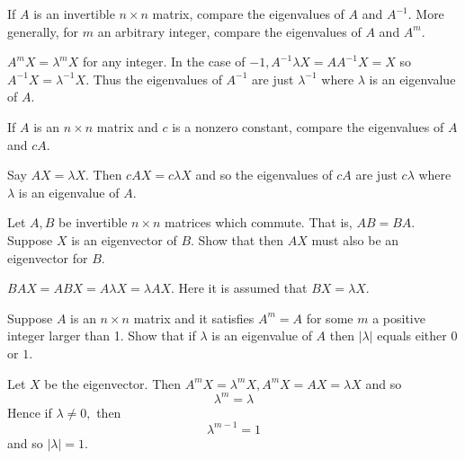 \begin{enumialphparenastyle}

\begin{ex} If $A$ is an invertible $n\times n$ matrix, compare the eigenvalues of
$A$ and $A^{-1}$. More generally, for $m$ an arbitrary integer, compare the
eigenvalues of $A$ and $A^{m}$. \vspace{1mm}
\begin{sol}
$A^{m}X=\lambda ^{m}X$ for
any integer. In the case of $-1,A^{-1}\lambda X=AA^{-1}X=X$
so $A^{-1}X =\lambda ^{-1}X$. Thus the eigenvalues of $A^{-1}$ are just $\lambda ^{-1}$ where $\lambda $ is an eigenvalue of $A$.
\end{sol}
\end{ex} 

\begin{ex} If $A$ is an $n\times n$ matrix and $c$ is a nonzero constant, compare
the eigenvalues of $A$ and $cA$. \vspace{1mm} 
\begin{sol}
Say $AX=\lambda X.$ Then $
cAX=c\lambda X$ and so the eigenvalues of $cA$ are just $
c\lambda $ where $\lambda $ is an eigenvalue of $A$.
\end{sol}
\end{ex}

\begin{ex} Let $A,B$ be invertible $n\times n$ matrices which commute. That is, $AB=BA$. Suppose $X$ is an eigenvector of $B$. Show that then 
$AX$ must also be an eigenvector for $B$. \vspace{1mm} 
\begin{sol}
 $BAX=ABX
=A\lambda X=\lambda AX$. Here it is assumed that $BX=\lambda X$.
\end{sol}
\end{ex}

\begin{ex} Suppose $A$ is an $n\times n$ matrix and it satisfies $A^{m}=A$ for
some $m$ a positive integer larger than 1. Show that if $\lambda $ is an
eigenvalue of $A$ then $\left\vert \lambda \right\vert $ equals either 0 or $
1$. \vspace{1mm}
\begin{sol}
Let $X$ be the eigenvector. Then $A^{m}X=\lambda ^{m}
X,A^{m}X=AX=\lambda X$ and so
\[
\lambda ^{m}=\lambda
\]
Hence if $\lambda \neq 0,$ then
\[
\lambda ^{m-1}=1
\]
and so $\left\vert \lambda \right\vert =1.$
\end{sol}
\end{ex}


\end{enumialphparenastyle}
